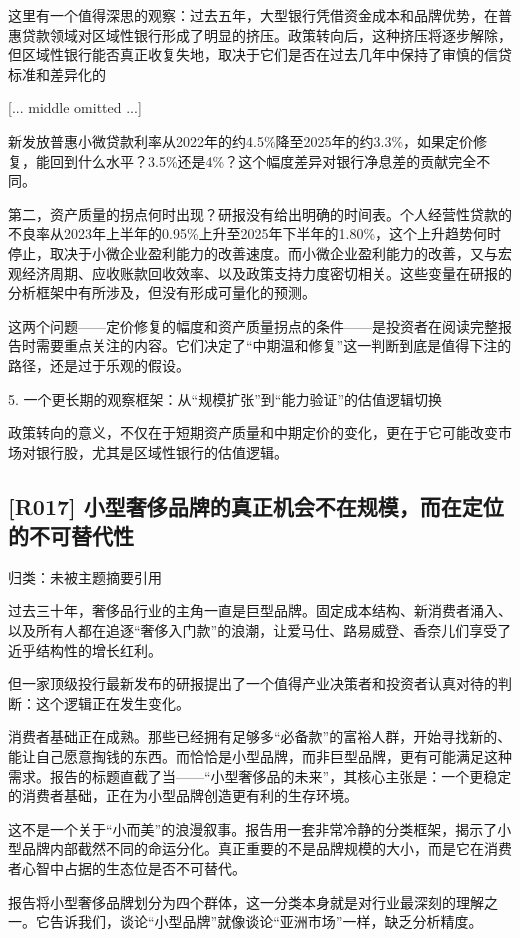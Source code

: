 \documentclass[11pt]{ctexart}
\begin{document}
这里有一个值得深思的观察：过去五年，大型银行凭借资金成本和品牌优势，在普惠贷款领域对区域性银行形成了明显的挤压。政策转向后，这种挤压将逐步解除，但区域性银行能否真正收复失地，取决于它们是否在过去几年中保持了审慎的信贷标准和差异化的

[... middle omitted ...]

新发放普惠小微贷款利率从2022年的约4.5\%降至2025年的约3.3\%，如果定价修复，能回到什么水平？3.5\%还是4\%？这个幅度差异对银行净息差的贡献完全不同。

第二，资产质量的拐点何时出现？研报没有给出明确的时间表。个人经营性贷款的不良率从2023年上半年的0.95\%上升至2025年下半年的1.80\%，这个上升趋势何时停止，取决于小微企业盈利能力的改善速度。而小微企业盈利能力的改善，又与宏观经济周期、应收账款回收效率、以及政策支持力度密切相关。这些变量在研报的分析框架中有所涉及，但没有形成可量化的预测。

这两个问题——定价修复的幅度和资产质量拐点的条件——是投资者在阅读完整报告时需要重点关注的内容。它们决定了“中期温和修复”这一判断到底是值得下注的路径，还是过于乐观的假设。

5. 一个更长期的观察框架：从“规模扩张”到“能力验证”的估值逻辑切换

政策转向的意义，不仅在于短期资产质量和中期定价的变化，更在于它可能改变市场对银行股，尤其是区域性银行的估值逻辑。

\subsection{[R017] 小型奢侈品牌的真正机会不在规模，而在定位的不可替代性}
{\small\color{refgray}归类：未被主题摘要引用}

过去三十年，奢侈品行业的主角一直是巨型品牌。固定成本结构、新消费者涌入、以及所有人都在追逐“奢侈入门款”的浪潮，让爱马仕、路易威登、香奈儿们享受了近乎结构性的增长红利。

但一家顶级投行最新发布的研报提出了一个值得产业决策者和投资者认真对待的判断：这个逻辑正在发生变化。

消费者基础正在成熟。那些已经拥有足够多“必备款”的富裕人群，开始寻找新的、能让自己愿意掏钱的东西。而恰恰是小型品牌，而非巨型品牌，更有可能满足这种需求。报告的标题直截了当——“小型奢侈品的未来”，其核心主张是：一个更稳定的消费者基础，正在为小型品牌创造更有利的生存环境。

这不是一个关于“小而美”的浪漫叙事。报告用一套非常冷静的分类框架，揭示了小型品牌内部截然不同的命运分化。真正重要的不是品牌规模的大小，而是它在消费者心智中占据的生态位是否不可替代。

报告将小型奢侈品牌划分为四个群体，这一分类本身就是对行业最深刻的理解之一。它告诉我们，谈论“小型品牌”就像谈论“亚洲市场”一样，缺乏分析精度。
\end{document}
